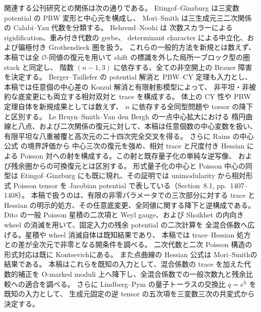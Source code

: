 \documentclass[11pt,a4paper]{ltjsarticle}
\numberwithin{equation}{section}
\begin{document}
関連する公刊研究との関係は次の通りである。
Etingof--Ginzburg \cite{NFMEG} は三変数 potential の PBW 変形と中心元を構成し、
Mori--Smith \cite{MoriSmith} は三生成元三二次関係の Calabi--Yau 代数を分類する。
Behrend--Noohi \cite[Sections~2.3, 3.1.2]{NFMBehrendNoohi} は
次数スカラーによる rigidification、重み付き代数の gerbe、
determinant character による中立化、および偏極付き Grothendieck 圏を扱う。
これらの一般的方法を新規とは数えず、本稿では全 $\mathcal O$-同値の復元を用いて
shift の標識を外した局所一ブロック型の圏 stack と同定し、
階数 $(n-1,3)$ に依存する、全ての非空開上の Brauer 障害を決定する。
Berger--Taillefer \cite{NFMBeTa} の potential 解消と PBW--CY 定理も入力とし、
本稿では任意個の中心差の Koszul 解消と有限射影模型によって、
非平坦・非被約な底変更にも両立する相対双対と trace を構成する。
体上の CY 性や PBW 定理自体を新規成果としては数えず、
$n$ に依存する全同型問題や torsor の降下と区別する。
Le Bruyn--Smith--Van den Bergh \cite{LBSV} の一点中心拡大における
楕円曲線と八点、および二次関係の復元に対して、本稿は任意個数の中心変数を扱い、
有限平坦な八重被覆と高次元の二十四次完全交叉を得る。
さらに Rains の中心公式 \cite[\S9, p.~1414]{NFMEG} の境界評価から
中心三次の復元を強め、相対 trace と尺度付き Hessian による
Poisson 対への射を構成する。この射と既存量子化の単純な逆写像、
および残余圏からの可換復元とは区別する。
形式量子化の中心と Poisson 中心の同型は
Etingof--Ginzburg\cite[Proposition~8.1.1, equation~(8.1.3)]{NFMEG}
にも既に現れ、その証明では unimodularity から相対形式 Poisson tensor を
Jacobian potential で表している（Section~8.1, pp.~1407--1408）。
本稿で扱うのは、有限の非零パラメータでの三次部分に対する
trace と Hessian の明示的処方、その任意底変更、全同値に関する降下と逆構成である。
Dito\cite[Section~2, equation~(3); Section~3, Theorem~2]{NFMDito} の一般 Poisson
星積の二次項と Weyl gauge、および Shoikhet\cite[Sections~1.3, 2.3.1]{NFMShoikhet}
の内向き wheel の消滅を用いて、固定入力の残余 potential の二次計算を
全混合係数へ広げる。星積や wheel 消滅自体は既知結果であり、
本稿では trace--Hessian 処方との差が全次元で非零となる開条件を調べる。
二次代数と二次 Poisson 構造の形式対応は既に
Kontsevich\cite[Section~2.3, Proposition~6]{NFMKontsevichAlg}にある。
また点曲線の Hessian 公式は Mori--Smith\cite[Theorems~1.2, 7.2]{MoriSmith}の結果である。
本稿はこれらを既知の入力として、混合係数の trace を加えた代数的補正を
O-marked moduli 上へ降下し、全混合係数での一般次数九と残余比較への適合を調べる。
さらに Lindberg--Pym\cite[Section~1.6; Theorem~6.9 and Remark~6.10]{NFMLindbergPym}
の量子トーラスの交換比 $q=e^\hbar$ を既知の入力として、
生成元固定の逆 tensor の五次項を三変数三次の共変式から決定する。
\end{document}

